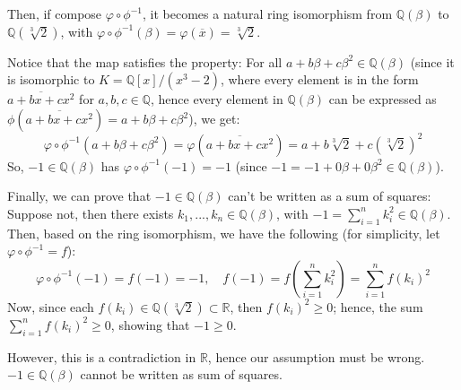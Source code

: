 \documentclass{article}
\begin{document}
Then, if compose $\varphi\circ \phi^{-1}$, it becomes a natural ring isomorphism from $\mathbb{Q}(\beta)$ to $\mathbb{Q}(\sqrt[3]{2})$, with $\varphi\circ \phi^{-1}(\beta)=\varphi(\overline{x})=\sqrt[3]{2}$.

Notice that the map satisfies the property: For all $a+b\beta+c\beta^2\in \mathbb{Q}(\beta)$ (since it is isomorphic to $K=\mathbb{Q}[x]/(x^3-2)$, where every element is in the form $\overline{a+bx+cx^2}$ for $a,b,c\in\mathbb{Q}$, 
hence every element in $\mathbb{Q}(\beta)$ can be expressed as $\phi(\overline{a+bx+cx^2})=a+b\beta+c\beta^2$),
we get: 
$$\varphi\circ\phi^{-1}(a+b\beta+c\beta^2)=\varphi(\overline{a+bx+cx^2}) = a+b\sqrt[3]{2}+c(\sqrt[3]{2})^2$$
So, $-1\in\mathbb{Q}(\beta)$ has $\varphi\circ\phi^{-1}(-1)=-1$ (since $-1=-1+0\beta+0\beta^2\in\mathbb{Q}(\beta)$).

\hfil

Finally, we can prove that $-1\in\mathbb{Q}(\beta)$ can't be written as a sum of squares: Suppose not, then there exists $k_1,...,k_n\in\mathbb{Q}(\beta)$,
with $-1 = \sum_{i=1}^{n}k_i^2\in\mathbb{Q}(\beta)$. Then, based on the ring isomorphism, we have the following (for simplicity, let $\varphi\circ\phi^{-1}=f$):
$$\varphi\circ\phi^{-1}(-1)=f(-1)=-1,\quad f(-1)=f\left(\sum_{i=1}^{n}k_i^2\right)=\sum_{i=1}^{n}f(k_i)^2$$
Now, since each $f(k_i)\in \mathbb{Q}(\sqrt[3]{2})\subset\mathbb{R}$, then $f(k_i)^2\geq 0$; hence, the sum $\sum_{i=1}^{n}f(k_i)^2\geq 0$, showing that $-1 \geq 0$.

However, this is a contradiction in $\mathbb{R}$, hence our assumption must be wrong. $-1\in\mathbb{Q}(\beta)$ cannot be written as sum of squares.
\end{document}

